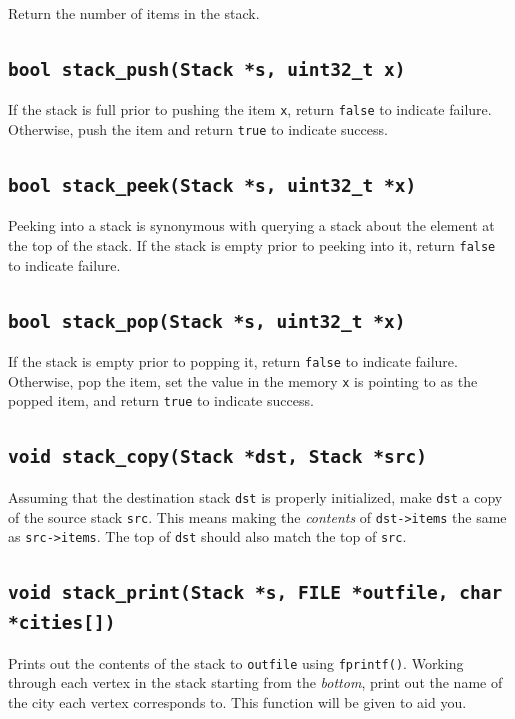 \documentclass[11pt]{article}
\begin{document}
Return the number of items in the stack.

\subsection{\texttt{bool stack\_push(Stack *s, uint32\_t x)}}

If the stack is full prior to pushing the item \texttt{x}, return
\texttt{false} to indicate failure.  Otherwise, push the item and return
\texttt{true} to indicate success.

\subsection{\texttt{bool stack\_peek(Stack *s, uint32\_t *x)}}

Peeking into a stack is synonymous with querying a stack about the
element at the top of the stack.  If the stack is empty prior to peeking
into it, return \texttt{false} to indicate failure.

\subsection{\texttt{bool stack\_pop(Stack *s, uint32\_t *x)}}

If the stack is empty prior to popping it, return \texttt{false} to
indicate failure. Otherwise, pop the item, set the value in the memory
\texttt{x} is pointing to as the popped item, and return \texttt{true}
to indicate success.

\subsection{\texttt{void stack\_copy(Stack *dst, Stack *src)}}

Assuming that the destination stack \texttt{dst} is properly initialized,
make \texttt{dst} a copy of the source stack \texttt{src}. This means
making the \emph{contents} of \texttt{dst->items} the same as
\texttt{src->items}. The top of \texttt{dst} should also match the top
of \texttt{src}.

\subsection{\texttt{void stack\_print(Stack *s, FILE *outfile, char
*cities[])}}

Prints out the contents of the stack to \texttt{outfile} using
\texttt{fprintf()}. Working through each vertex in the stack starting
from the \emph{bottom}, print out the name of the city each vertex
corresponds to. This function will be given to aid you.
\end{document}
